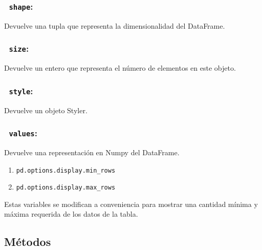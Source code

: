         \subsubsection{~\hspace{2em}\texttt{shape}:} Devuelve una tupla que representa la dimensionalidad del DataFrame.

        \subsubsection{~\hspace{2em}\texttt{size}:} Devuelve un entero que representa el número de elementos en este objeto.

        \subsubsection{~\hspace{2em}\texttt{style}:} Devuelve un objeto Styler.

        \subsubsection{~\hspace{2em}\texttt{values}:} Devuelve una representación en Numpy del DataFrame.


        \begin{enumerate}
            \item\texttt{pd.options.display.min\_rows}
            \item\texttt{pd.options.display.max\_rows}
        \end{enumerate}
        Estas variables se modifican a conveniencia para mostrar una cantidad mínima y máxima requerida de los datos de la tabla.

        \subsection{Métodos}


